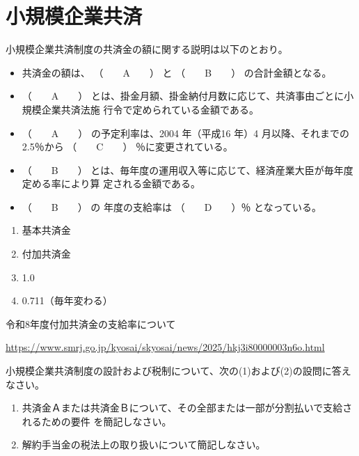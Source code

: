 \section{小規模企業共済}

\begin{fillblank}[年金1 2022 問題1(6)(イ)改題]
  小規模企業共済制度の共済金の額に関する説明は以下のとおり。
  \begin{itemize}
    \item 共済金の額は、 （　　A　　） と （　　B　　） の合計金額となる。
    \item （　　A　　） とは、掛金月額、掛金納付月数に応じて、共済事由ごとに小規模企業共済法施
行令で定められている金額である。
\item （　　A　　） の予定利率は、2004 年（平成16 年）4 月以降、それまでの2.5％から
（　　C　　） ％に変更されている。
\item （　　B　　） とは、毎年度の運用収入等に応じて、経済産業大臣が毎年度定める率により算
定される金額である。
\item  （　　B　　） の \warekiyear 年度の支給率は （　　D　　）％ となっている。
  \end{itemize}
\end{fillblank}

\begin{answerbox}
  \begin{enumerate}[A:]
    \item 基本共済金
    \item 付加共済金
    \item 1.0
    \item 0.711（毎年変わる）
  \end{enumerate}
\end{answerbox}

\begin{explanationbox}
  令和8年度付加共済金の支給率について

  \url{https://www.smrj.go.jp/kyosai/skyosai/news/2025/hkj3i80000003n6o.html}
\end{explanationbox}

\begin{shortanswer}[年金1 2021 問題2(4)]
  小規模企業共済制度の設計および税制について、次の(1)および(2)の設問に答えなさい。
  \begin{enumerate}[(1)]
    \item 共済金Ａまたは共済金Ｂについて、その全部または一部が分割払いで支給されるための要件
を簡記しなさい。
\item  解約手当金の税法上の取り扱いについて簡記しなさい。
  \end{enumerate}

\end{shortanswer}

